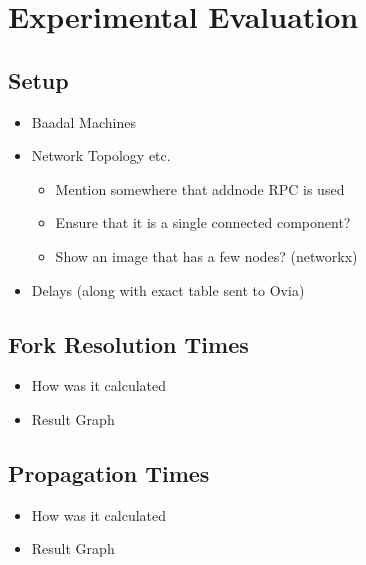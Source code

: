 \chapter{Experimental Evaluation} \label{ch-exp}


\section{Setup} \label{exp-setup}

\begin{itemize}
    \item Baadal Machines
    
    \item Network Topology etc.
    \begin{itemize}
        \item Mention somewhere that addnode RPC is used
        \item Ensure that it is a single connected component?
        \item Show an image that has a few nodes? (networkx)
    \end{itemize}
    
    \item Delays (along with exact table sent to Ovia)
\end{itemize}


\newpage
\section{Fork Resolution Times} \label{exp-fork}

\begin{itemize}
    \item How was it calculated
    \item Result Graph
\end{itemize}


\newpage
\section{Propagation Times} \label{exp-prop}

\begin{itemize}
    \item How was it calculated
    \item Result Graph
\end{itemize}

